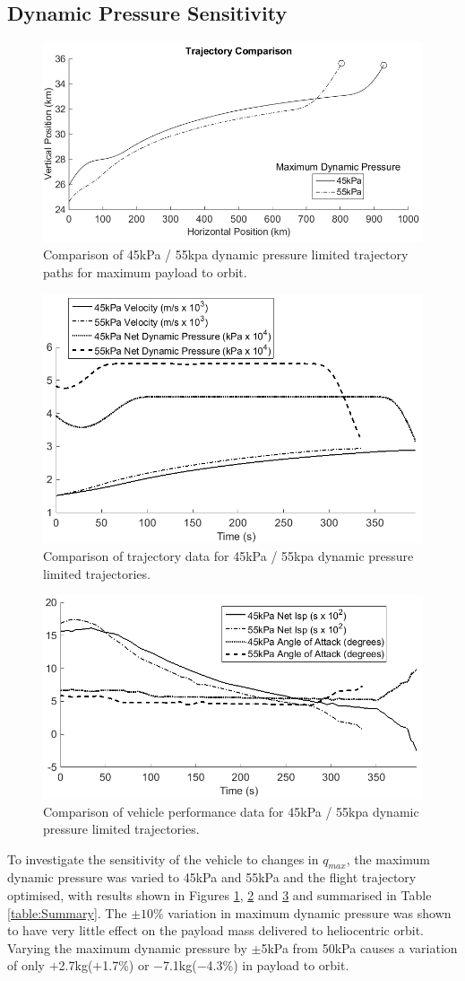 \documentclass[]{aiaa-tc}
\newcommand{\qVariationPluskg}{$+$2.7kg}
\newcommand{\qVariationMinuskg}{$-$7.1kg}
\newcommand{\qVariationPlus}{$+$1.7\%}
\newcommand{\qVariationMinus}{$-$4.3\%}
\begin{document}
\subsection{Dynamic Pressure Sensitivity}\label{subsection:qvariation}
\begin{figure}[ht]
	\centering
	\includegraphics[width=.7\linewidth]{Multipleq}
	\caption{Comparison of 45kPa / 55kpa dynamic pressure limited trajectory paths for maximum payload to orbit.}
	\label{fig:multipleq}
\end{figure}
\begin{figure}[ht]
	\centering
	
	\includegraphics[width=.6\linewidth]{MultipleqAero}
	\caption{Comparison of trajectory data for 45kPa / 55kpa dynamic pressure limited trajectories.}
	\label{fig:multipleq aero}
\end{figure}
\begin{figure}[ht]
	\centering
	\includegraphics[width=.6\linewidth]{Multipleq-Vehicle}
	\caption{Comparison of vehicle performance data for 45kPa / 55kpa dynamic pressure limited trajectories.}
	\label{fig:multipleq vehicle}
\end{figure}
To investigate the sensitivity of the vehicle to changes in $q_{max}$, the maximum dynamic pressure was varied to 45kPa and 55kPa and the flight trajectory optimised, with results shown in Figures \ref{fig:multipleq}, \ref{fig:multipleq aero} and \ref{fig:multipleq vehicle} and summarised in Table \ref{table:Summary}.
The $\pm10\%$ variation in maximum dynamic pressure was shown to have very little effect on the payload mass delivered to heliocentric orbit.  Varying the maximum dynamic pressure by $\pm$5kPa from 50kPa causes a variation of only  \qVariationPluskg (\qVariationPlus) or \qVariationMinuskg (\qVariationMinus) in payload to orbit.  
\end{document}
